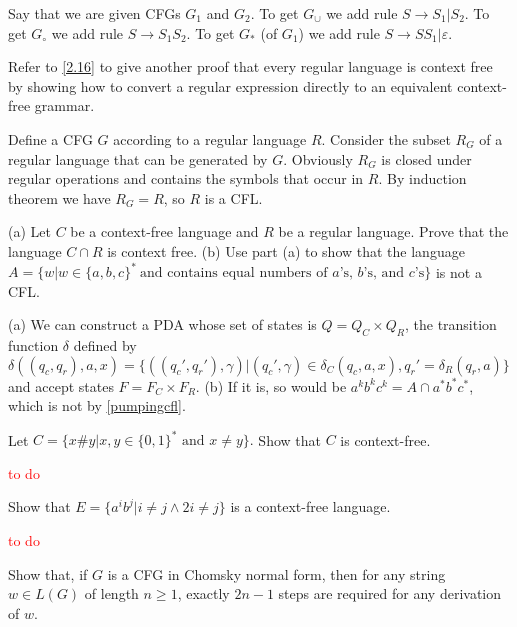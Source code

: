 Say that we are given CFGs $G_1$ and $G_2$. To get $G_{\cup}$ we add rule $S\to S_1|S_2$. To get $G_{\circ}$ we add rule $S\to S_1S_2$. To get $G_{*}$ (of $G_1$) we add rule $S\to SS_1|\varepsilon$.

\begin{exercise}{2.17}
  Refer to \ref{2.16} to give another proof that every regular language is context free by showing how to convert a regular expression directly to an equivalent context-free grammar.
\end{exercise}

Define a CFG $G$ according to a regular language $R$. Consider the subset $R_G$ of a regular language that can be generated by $G$. Obviously $R_G$ is closed under regular operations and contains the symbols that occur in $R$. By induction theorem we have $R_G=R$, so $R$ is a CFL.

\begin{exercise}{2.18}
  (a) Let $C$ be a context-free language and $R$ be a regular language. Prove that the language $C\cap R$ is context free. (b) Use part (a) to show that the language $A = \{w| w \in \{a, b, c\}^*\ \text{and contains equal numbers of $a$'s, $b$'s, and $c$'s}\}$ is not a CFL.
\end{exercise}

(a) We can construct a PDA whose set of states is $Q=Q_{C}\times Q_{R}$, the transition function $\delta$ defined by $\delta((q_c, q_r),a,x)=\{((q_c',q_r'),\gamma)|(q_c',\gamma)\in \delta_C(q_c,a,x),q_r'=\delta_R(q_r,a)\}$ and accept states $F=F_C\times F_R$. (b) If it is, so would be $a^kb^kc^k=A\cap a^*b^*c^*$, which is not by \ref{pumpingcfl}.

\setcounter{exercise}{21}

\begin{exercise}{2.22}
  Let $C=\{x\#y|x,y\in\{0,1\}^*\text{ and }x\neq y\}.$ Show that $C$ is context-free.
\end{exercise}

\textcolor{red}{to do}

\setcounter{exercise}{23}

\begin{exercise}{2.24}
  Show that $E=\{a^ib^j|i\neq j \wedge 2i\neq j\}$ is a context-free language.
\end{exercise}

\textcolor{red}{to do}

\setcounter{exercise}{25}

\begin{exercise}{2.26}
  Show that, if $G$ is a CFG in Chomsky normal form, then for any string $w \in L(G)$ of length $n \geq 1$, exactly $2n - 1$ steps are required for any derivation of $w$.
\end{exercise}

